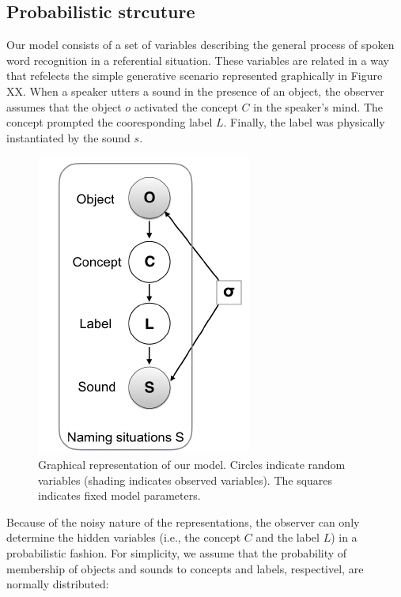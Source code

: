 \documentclass[10pt, letterpaper]{article}
\newenvironment{CodeChunk}{}{}
\begin{document}
\subsection{Probabilistic strcuture}\label{probabilistic-strcuture}

Our model consists of a set of variables describing the general process
of spoken word recognition in a referential situation. These variables
are related in a way that refelects the simple generative scenario
represented graphically in Figure XX. When a speaker utters a sound in
the presence of an object, the observer assumes that the object \(o\)
activated the concept \(C\) in the speaker's mind. The concept prompted
the cooresponding label \(L\). Finally, the label was physically
instantiated by the sound \(s\).

\begin{CodeChunk}
\begin{figure}[H]

{\centering \includegraphics{figs/model-1} 

}

\caption{\label{fig:model}Graphical representation of our model. Circles indicate random variables (shading indicates observed variables). The squares indicates fixed model parameters.}\label{fig:model}
\end{figure}
\end{CodeChunk}

Because of the noisy nature of the representations, the observer can
only determine the hidden variables (i.e., the concept \(C\) and the
label \(L\)) in a probabilistic fashion. For simplicity, we assume that
the probability of membership of objects and sounds to concepts and
labels, respectivel, are normally distributed:
\end{document}
